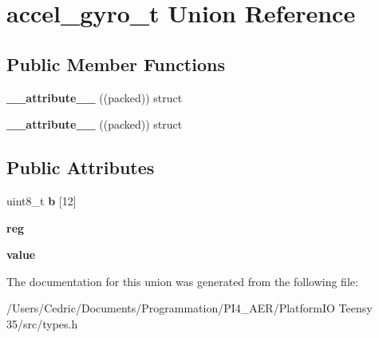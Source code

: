 \hypertarget{unionaccel__gyro__t}{}\section{accel\+\_\+gyro\+\_\+t Union Reference}
\label{unionaccel__gyro__t}
\subsection*{Public Member Functions}
\begin{DoxyCompactItemize}
\item 
\mbox{\label{unionaccel__gyro__t_abdc0cf67a7d86f39e740480fba9ffa55}} 
{\bfseries \+\_\+\+\_\+attribute\+\_\+\+\_\+} ((packed)) struct
\item 
\mbox{\label{unionaccel__gyro__t_abdc0cf67a7d86f39e740480fba9ffa55}} 
{\bfseries \+\_\+\+\_\+attribute\+\_\+\+\_\+} ((packed)) struct
\end{DoxyCompactItemize}
\subsection*{Public Attributes}
\begin{DoxyCompactItemize}
\item 
\mbox{\label{unionaccel__gyro__t_a7f9190f2f4ba0ab5fd83b56e6c8d3976}} 
uint8\+\_\+t {\bfseries b} \mbox{[}12\mbox{]}
\item 
\mbox{\label{unionaccel__gyro__t_a790c30e6191de3726a9f30e022ee8c58}} 
{\bfseries reg}
\item 
\mbox{\label{unionaccel__gyro__t_a8c04004b0ed2414147ff05c76259812c}} 
{\bfseries value}
\end{DoxyCompactItemize}


The documentation for this union was generated from the following file\+:\begin{DoxyCompactItemize}
\item 
/\+Users/\+Cedric/\+Documents/\+Programmation/\+P\+I4\+\_\+\+A\+E\+R/\+Platform\+I\+O Teensy 35/src/types.\+h\end{DoxyCompactItemize}
